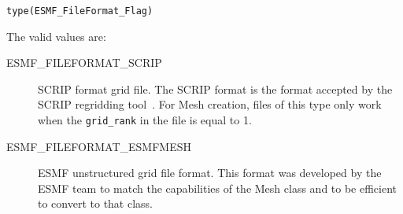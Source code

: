 {\tt type(ESMF\_FileFormat\_Flag)}

The valid values are:
\begin{description}
\item [ESMF\_FILEFORMAT\_SCRIP] SCRIP format grid file. The SCRIP format is the format accepted by the SCRIP regridding tool~\cite{ref:SCRIP}.   For Mesh creation, files of this type only work when the {\tt grid\_rank} in the file is equal to 1.

\item [ESMF\_FILEFORMAT\_ESMFMESH] ESMF unstructured grid file format. This format was developed by the ESMF team to match the capabilities of the Mesh class and to be efficient to convert to that class. 
\end{description}

